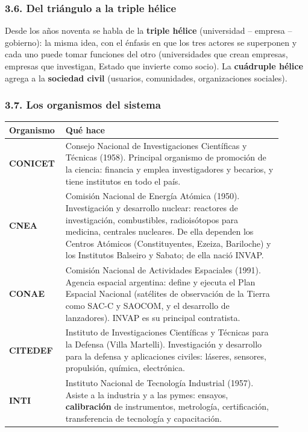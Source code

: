 \subsubsection*{3.6. Del triángulo a la triple hélice}
Desde los años noventa se habla de la \textbf{triple hélice}
(universidad -- empresa -- gobierno): la misma idea, con el énfasis en que los tres actores
se superponen y cada uno puede tomar funciones del otro (universidades que crean empresas,
empresas que investigan, Estado que invierte como socio). La \textbf{cuádruple hélice} agrega
a la \textbf{sociedad civil} (usuarios, comunidades, organizaciones sociales).

\subsubsection*{3.7. Los organismos del sistema}
\begin{center}
\small
\begin{tabular}{|p{0.15\linewidth}|p{0.75\linewidth}|}
\hline
\textbf{Organismo} & \textbf{Qué hace} \\ \hline
\textbf{CONICET} & Consejo Nacional de Investigaciones Científicas y Técnicas (1958). Principal
organismo de promoción de la ciencia: financia y emplea investigadores y becarios, y tiene
institutos en todo el país. \\ \hline
\textbf{CNEA} & Comisión Nacional de Energía Atómica (1950). Investigación y desarrollo nuclear:
reactores de investigación, combustibles, radioisótopos para medicina, centrales nucleares.
De ella dependen los Centros Atómicos (Constituyentes, Ezeiza, Bariloche) y los Institutos
Balseiro y Sabato; de ella nació INVAP. \\ \hline
\textbf{CONAE} & Comisión Nacional de Actividades Espaciales (1991). Agencia espacial argentina:
define y ejecuta el Plan Espacial Nacional (satélites de observación de la Tierra como SAC-C
y SAOCOM, y el desarrollo de lanzadores). INVAP es su principal contratista. \\ \hline
\textbf{CITEDEF} & Instituto de Investigaciones Científicas y Técnicas para la Defensa
(Villa Martelli). Investigación y desarrollo para la defensa y aplicaciones civiles: láseres,
sensores, propulsión, química, electrónica. \\ \hline
\textbf{INTI} & Instituto Nacional de Tecnología Industrial (1957). Asiste a la industria y a
las pymes: ensayos, \textbf{calibración} de instrumentos, metrología, certificación,
transferencia de tecnología y capacitación. \\ \hline
\end{tabular}
\end{center}

